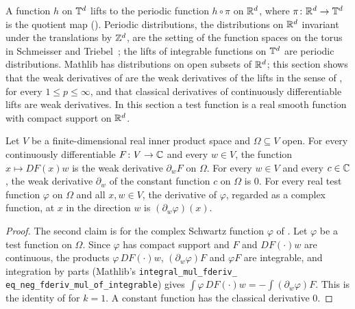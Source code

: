 A function $h$ on $\mathbb{T}^d$ lifts to the periodic function $h \circ \pi$ on $\mathbb{R}^d$, where
$\pi \colon \mathbb{R}^d \to \mathbb{T}^d$ is the quotient map (). Periodic distributions,
the distributions on $\mathbb{R}^d$ invariant under the translations by $\mathbb{Z}^d$, are the setting of the
function spaces on the torus in Schmeisser and Triebel~\cite{SchmeisserTriebel}; the lifts of
integrable functions on $\mathbb{T}^d$ are periodic distributions. Mathlib has distributions on open
subsets of $\mathbb{R}^d$; this section shows that the weak derivatives of
 are the weak derivatives of the lifts in the sense of
, for every $1 \leq p \leq \infty$, and that classical derivatives
of continuously differentiable lifts are weak derivatives. In this section a test function is a
real smooth function with compact support on $\mathbb{R}^d$.

\begin{lemma}
\label{lem:weak-derivative-classical}
\leanok
{}
Let $V$ be a finite-dimensional real inner product space and $\Omega \subseteq V$ open. For every
continuously differentiable $F \colon V \to \mathbb{C}$ and every $w \in V$, the function
$x \mapsto DF(x) w$ is the weak derivative $\partial_w F$ on $\Omega$. For every $w \in V$ and
every $c \in \mathbb{C}$, the weak derivative $\partial_w$ of the constant function $c$ on $\Omega$ is
$0$. For every real test
function $\varphi$ on $\Omega$ and all $x, w \in V$, the derivative of $\varphi$, regarded as a
complex function, at $x$ in the direction $w$ is $(\partial_w \varphi)(x)$.
\end{lemma}

\begin{proof}
\leanok
The second claim is  for the complex Schwartz function
$\varphi$ of . Let $\varphi$ be a test function on $\Omega$. Since
$\varphi$ has compact support and $F$ and $DF(\cdot) w$ are continuous, the products
$\varphi \, DF(\cdot) w$, $(\partial_w \varphi) F$ and $\varphi F$ are integrable, and integration
by parts (Mathlib's \texttt{integral\_\allowbreak mul\_\allowbreak fderiv\_\allowbreak
eq\_\allowbreak neg\_\allowbreak fderiv\_\allowbreak mul\_\allowbreak of\_\allowbreak integrable})
gives $\int \varphi \, DF(\cdot) w = -\int (\partial_w \varphi) F$. This is the identity of
 for $k = 1$. A constant function has the classical
derivative $0$.
\end{proof}

